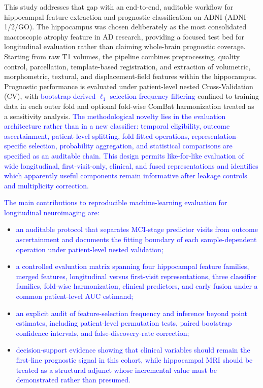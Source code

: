 \documentclass[review]{elsarticle}
\newcommand{\corrigir}[2]{%
	\textcolor{red}{\sout{#1}} %
	\textcolor{blue}{#2}%
}
\begin{document}
	This study addresses that gap with an end-to-end, auditable workflow for hippocampal feature extraction and prognostic classification on ADNI (ADNI-1/2/GO). The hippocampus was chosen deliberately as the most consolidated macroscopic atrophy feature in AD research, providing a focused test bed for longitudinal evaluation rather than claiming whole-brain prognostic coverage. Starting from raw T1 volumes, the pipeline combines preprocessing, quality control, parcellation, template-based registration, and extraction of volumetric, morphometric, textural, and displacement-field features within the hippocampus. Prognostic performance is evaluated under patient-level nested Cross-Validation (CV), with \corrigir{}{bootstrap-derived $\ell_1$ selection-frequency filtering} confined to training data in each outer fold and optional fold-wise ComBat harmonization treated as a sensitivity analysis. \corrigir{}{The methodological novelty lies in the evaluation architecture rather than in a new classifier: temporal eligibility, outcome ascertainment, patient-level splitting, fold-fitted operations, representation-specific selection, probability aggregation, and statistical comparisons are specified as an auditable chain. This design permits like-for-like evaluation of wide longitudinal, first-visit-only, clinical, and fused representations and identifies which apparently useful components remain informative after leakage controls and multiplicity correction.}
	
	\corrigir{}{The main contributions to reproducible machine-learning evaluation for longitudinal neuroimaging are:}
	\begin{itemize}
		\item \corrigir{}{an auditable protocol that separates MCI-stage predictor visits from outcome ascertainment and documents the fitting boundary of each sample-dependent operation under patient-level nested validation;}
		
		\item \corrigir{}{a controlled evaluation matrix spanning four hippocampal feature families, merged features, longitudinal versus first-visit representations, three classifier families, fold-wise harmonization, clinical predictors, and early fusion under a common patient-level AUC estimand;}
		
		\item \corrigir{}{an explicit audit of feature-selection frequency and inference beyond point estimates, including patient-level permutation tests, paired bootstrap confidence intervals, and false-discovery-rate correction;}
		
		\item \corrigir{}{decision-support evidence showing that clinical variables should remain the first-line prognostic signal in this cohort, while hippocampal MRI should be treated as a structural adjunct whose incremental value must be demonstrated rather than presumed.}
	\end{itemize}
	
\end{document}
